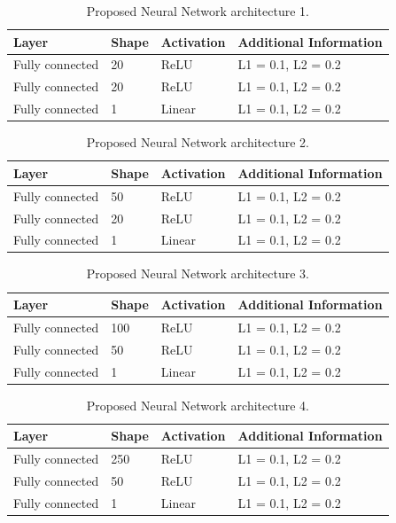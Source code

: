 \documentclass[preprint,12pt]{elsarticle}%
\begin{document}
\begin{table}[tbh]
\centering
\caption{Proposed Neural Network architecture 1.}%
\begin{tabular}
[c]{llll}\hline
Layer & Shape & Activation & Additional Information\\\hline\hline
Fully connected & 20 & ReLU & L1 = 0.1, L2 = 0.2\\
Fully connected & 20 & ReLU & L1 = 0.1, L2 = 0.2\\
Fully connected & 1 & Linear & L1 = 0.1, L2 = 0.2\\\hline
\end{tabular}
\label{table:proposed_nn_1}%
\end{table}

\begin{table}[tbh]
\centering
\caption{Proposed Neural Network architecture 2.}%
\begin{tabular}
[c]{llll}\hline
Layer & Shape & Activation & Additional Information\\\hline\hline
Fully connected & 50 & ReLU & L1 = 0.1, L2 = 0.2\\
Fully connected & 20 & ReLU & L1 = 0.1, L2 = 0.2\\
Fully connected & 1 & Linear & L1 = 0.1, L2 = 0.2\\\hline
\end{tabular}
\label{table:proposed_nn_2}%
\end{table}

\begin{table}[tbh]
\centering
\caption{Proposed Neural Network architecture 3.}%
\begin{tabular}
[c]{llll}\hline
Layer & Shape & Activation & Additional Information\\\hline
Fully connected & 100 & ReLU & L1 = 0.1, L2 = 0.2\\
Fully connected & 50 & ReLU & L1 = 0.1, L2 = 0.2\\
Fully connected & 1 & Linear & L1 = 0.1, L2 = 0.2\\\hline
\end{tabular}
\label{table:proposed_nn_3}%
\end{table}

\begin{table}[tbh]
\centering
\caption{Proposed Neural Network architecture 4.}%
\begin{tabular}
[c]{llll}\hline
Layer & Shape & Activation & Additional Information\\\hline
Fully connected & 250 & ReLU & L1 = 0.1, L2 = 0.2\\
Fully connected & 50 & ReLU & L1 = 0.1, L2 = 0.2\\
Fully connected & 1 & Linear & L1 = 0.1, L2 = 0.2\\\hline
\end{tabular}
\label{table:proposed_nn_4}%
\end{table}
\end{document}
